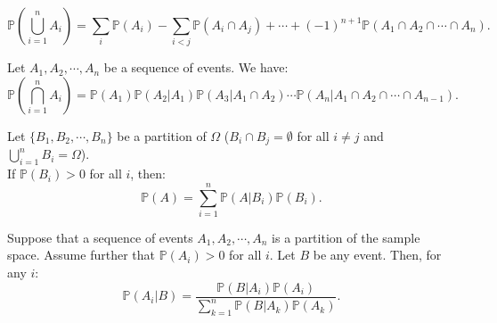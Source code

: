 \documentclass{huhtakm-template-book-v2}
\newcommand{\prob}{\mathbb{P}}
\begin{document}
    \begin{spro}
        \begin{equation*}
            \prob\left(\bigcup_{i = 1}^{n}A_{i}\right) = \sum_{i}\prob(A_{i}) - \sum_{i < j}\prob(A_{i} \cap A_{j}) + \cdots + (-1)^{n+1}\prob(A_{1} \cap A_{2} \cap \cdots \cap A_{n}).
        \end{equation*}
    \end{spro}
    \begin{spro}
        Let $A_{1}, A_{2}, \cdots, A_{n}$ be a sequence of events. We have:
        \begin{equation*}
            \prob\left(\bigcap_{i = 1}^{n}A_{i}\right) = \prob(A_{1})\prob(A_{2} | A_{1})\prob(A_{3} | A_{1} \cap A_{2}) \cdots \prob(A_{n} | A_{1} \cap A_{2} \cap \cdots \cap A_{n-1}).
        \end{equation*}
    \end{spro}
    \begin{spro}
        Let $\{B_{1}, B_{2}, \cdots, B_{n}\}$ be a partition of $\Omega$ ($B_{i} \cap B_{j} = \emptyset$ for all $i \neq j$ and $\bigcup_{i = 1}^{n}B_{i} = \Omega$).\\
        If $\prob(B_{i}) > 0$ for all $i$, then:
        \begin{equation*}
            \prob(A) = \sum_{i = 1}^{n}\prob(A | B_{i})\prob(B_{i}).
        \end{equation*}
    \end{spro}
    \begin{spro}
        Suppose that a sequence of events $A_{1}, A_{2}, \cdots, A_{n}$ is a partition of the sample space. Assume further that $\prob(A_{i}) > 0$ for all $i$. Let $B$ be any event. Then, for any $i$:
        \begin{equation*}
            \prob(A_{i} | B) = \frac{\prob(B | A_{i})\prob(A_{i})}{\sum_{k = 1}^{n}\prob(B | A_{k})\prob(A_{k})}.
        \end{equation*}
    \end{spro}
    \newpage
\end{document}
